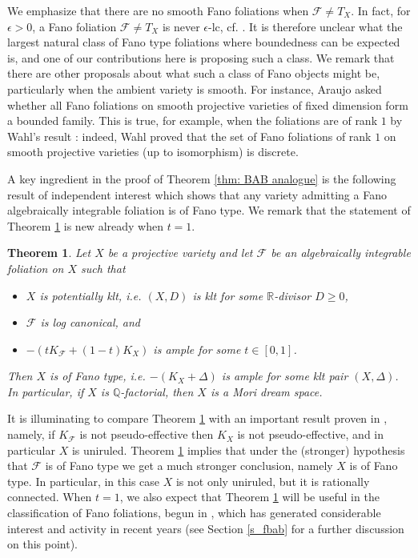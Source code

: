 \documentclass[12pt]{amsart}
\numberwithin{equation}{section}
\newcommand{\Ff}{\mathcal{F}}
\newtheorem{alphthm}{Theorem}
\theoremstyle{definition}
\theoremstyle{definition}
\theoremstyle{definition}
\begin{document}
We emphasize that there are no smooth Fano foliations when $\mathcal F \neq T_X$. 
In fact, for $\epsilon >0$, a Fano foliation $\mathcal F \neq T_X$ is never $\epsilon$-lc, cf. \cite[Proposition 5.3]{AD13}. 
It is therefore unclear what the largest natural class of Fano type foliations where boundedness can be expected is, and one of our contributions here is proposing such a class.  
We remark that there are other proposals about what such a class of Fano objects might be, particularly when the ambient variety is smooth. 
For instance, Araujo \cite[5:30]{Ara20} asked whether all Fano foliations on smooth projective varieties of fixed dimension form a bounded family. 
This is true, for example, when the foliations are of rank $1$ by Wahl's result \cite[Theorem 1]{Wah83}: 
indeed, Wahl proved that the set of Fano foliations of rank $1$ on smooth projective varieties (up to isomorphism) is discrete.

A key ingredient in the proof of Theorem \ref{thm: BAB analogue} is the following result of independent interest which shows that any variety admitting a Fano algebraically integrable foliation is of Fano type. 
We remark that the statement of Theorem \ref{thm: ft ai is ft} is new already when $t=1$.

\begin{alphthm}
\label{thm: ft ai is ft}
   Let $X$ be a projective variety and let $\mathcal F$ be an algebraically integrable foliation on $X$ such that
   \begin{itemize}
       \item $X$ is potentially klt, i.e. $(X, D)$ is klt for some $\mathbb R$-divisor $D \ge 0$,
       \item $\mathcal F$ is log canonical, and 
       \item $-(tK_{\Ff}+(1-t)K_X)$ is ample for some $t \in [0, 1]$.
   \end{itemize}
   
   Then $X$ is of Fano type, i.e. $-(K_X+\Delta)$ is ample for some klt pair $(X,\Delta)$. In particular, if $X$ is $\mathbb Q$-factorial, then $X$ is a Mori dream space.
\end{alphthm}

It is illuminating to compare Theorem \ref{thm: ft ai is ft} with an important result proven in  \cite{CP19}, namely, if $K_{\mathcal F}$ is not pseudo-effective then $K_X$ is not pseudo-effective, and in particular $X$ is uniruled. 
Theorem \ref{thm: ft ai is ft} implies that under the (stronger) hypothesis that $\mathcal F$ is of Fano type we get a much stronger conclusion, namely $X$ is of Fano type.  In particular, in this case $X$ is not only uniruled, but it is rationally connected.
When $t = 1$, we also expect that Theorem \ref{thm: ft ai is ft} will be useful in the classification of Fano foliations, begun in \cite{AD13}, which has generated considerable interest and activity in recent years (see Section \ref{s_fbab} for a further discussion on this point).
\end{document}
